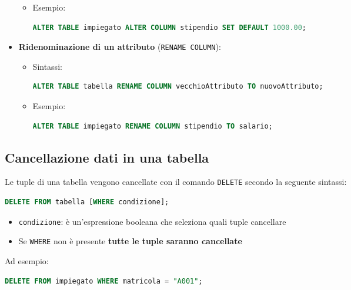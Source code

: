 \documentclass[a4paper,twoside]{article}
\begin{document}
\begin{itemize}
\begin{itemize}
      \item Esempio:
\begin{lstlisting}[language=SQL, numbers=none]
ALTER TABLE impiegato ALTER COLUMN stipendio SET DEFAULT 1000.00;
\end{lstlisting}
    \end{itemize}

  \item \textbf{Ridenominazione di un attributo} (\texttt{RENAME COLUMN}):
    \begin{itemize}
      \item Sintassi:
\begin{lstlisting}[language=SQL, numbers=none]
ALTER TABLE tabella RENAME COLUMN vecchioAttributo TO nuovoAttributo;
\end{lstlisting}
      \item Esempio:
\begin{lstlisting}[language=SQL, numbers=none]
ALTER TABLE impiegato RENAME COLUMN stipendio TO salario;
\end{lstlisting}
    \end{itemize}
\end{itemize}

\subsection{Cancellazione dati in una tabella}
Le tuple di una tabella vengono cancellate con il comando \texttt{DELETE} secondo
la seguente sintassi:
\begin{lstlisting}[language=SQL, numbers=none]
DELETE FROM tabella [WHERE condizione];
\end{lstlisting}
\begin{itemize}
  \item \texttt{condizione}: è un'espressione booleana che seleziona quali tuple
    cancellare

  \item Se \texttt{WHERE} non è presente \textbf{tutte le tuple saranno cancellate}
\end{itemize}
Ad esempio:
\begin{lstlisting}[language=SQL, numbers=none]
DELETE FROM impiegato WHERE matricola = "A001";
\end{lstlisting}
\end{document}
